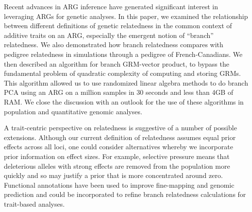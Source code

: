 
Recent advances in ARG inference have generated significant interest in leveraging ARGs for genetic analyses.
%
In this paper, we examined the relationship between different definitions of genetic relatedness
in the common context of additive traits on an ARG,
especially the emergent notion of ``branch'' relatedness.
%
We also demonstrated how branch relatedness compares with pedigree relatedness in simulations through a pedigree of French-Canadians.
%
We then described an algorithm for branch GRM-vector product, to bypass the fundamental problem of
quadratic complexity of computing and storing GRMs.
%
This algorithm allowed us to use randomized linear algebra methods
to do branch PCA using an ARG on a million samples in 30 seconds
and less than 4GB of RAM.
%
We close the discussion with an outlook for the use of these algorithms in population and quantitative genomic analyses.






A trait-centric perspective on relatedness is suggestive of a number of possible extensions. Although our current definition of relatedness assumes equal prior effects across all loci, one could consider alternatives whereby we incorporate prior information on effect sizes. For example, selective pressure means that deleterious alleles with strong effects are removed from the population more quickly and so may justify a prior that is more concentrated around zero. Functional annotations have been used to improve fine-mapping and genomic prediction \citep{weissbrod2020functionally, weissbrod2022leveraging} and could be incorporated to refine branch relatedness calculations for trait-based analyses.

